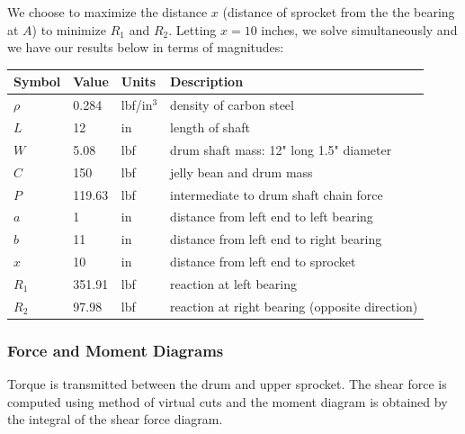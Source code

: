 \documentclass[letterpaper,12pt]{article}
\begin{document}
\noindent We choose to maximize the distance $x$ (distance of sprocket from the the bearing at $A$) to minimize $R_1$ and $R_2$. Letting $x = 10$ inches, we solve simultaneously and we have our results below in terms of magnitudes:

\begin{center}
	\begin{tabular}{ |p{1.5cm}||p{1.5cm}|p{2cm}|p{8cm}|  }
		\hline
		Symbol & Value & Units & Description\\
		\hline
		$\rho$ & 0.284 & lbf/in$^3$ & density of carbon steel\\
	    $L$ & 12 & in & length of shaft\\
		\hline
		$W$ & 5.08 & lbf  & drum shaft mass: 12" long 1.5" diameter\\
        $C$ & 150 & lbf & jelly bean and drum mass\\
		$P$ & 119.63 & lbf  & intermediate to drum shaft chain force\\
		\hline
		$a$ & 1 & in  & distance from left end to left bearing\\
		$b$ & 11 & in  & distance from left end to right bearing\\
		$x$ & 10 & in  & distance from left end to sprocket \\
		\hline
		$R_1$ & 351.91 & lbf  & reaction at left bearing\\
		$R_2$ & 97.98 & lbf  & reaction at right bearing (opposite direction)\\
		\hline
	\end{tabular}
\end{center}

\subsubsection{Force and Moment Diagrams}
Torque is transmitted between the drum and upper sprocket. The shear force is computed using method of virtual cuts and the moment diagram is obtained by the integral of the shear force diagram. 
\end{document}
